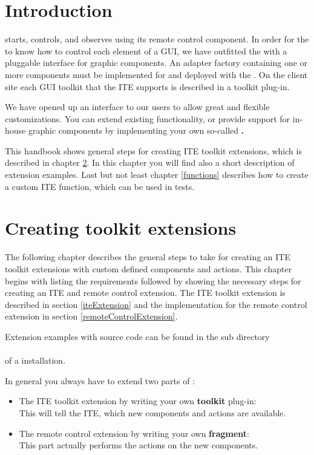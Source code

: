 \chapter{Introduction}
\label{introduction}

\app{} starts, controls, and observes \gdauts using its remote control component. In
order for the \gdagent to know how to control each element of a GUI, we have
outfitted the \gdagent with a pluggable interface for graphic components. An
adapter factory containing one or more components must be implemented for and
deployed with the \gdaut. On the client site each GUI toolkit that the ITE
supports is described in a toolkit plug-in.

We have opened up an interface to our users to allow great and flexible
customizations. You can extend existing functionality, or provide support for
in-house graphic components by implementing your own so-called
\textbf{\gdtesterclasses.}

This handbook shows general steps for creating ITE toolkit extensions, which
is described in chapter \ref{toolkitExtension}. In this chapter you will find
also  a short description of extension examples. Last but not least chapter
\ref{functions} describes how to create a custom ITE function, which can be
used in tests.

\chapter{Creating toolkit extensions}
\label{toolkitExtension}

The following chapter describes the general steps to take for creating an ITE
toolkit extensions with custom defined components and actions. This chapter
begins with listing the requirements followed by showing the necessary steps
for creating an ITE and remote control extension. The ITE toolkit extension is
described in section \ref{iteExtension} and the implementation for the remote
control extension in section \ref{remoteControlExtension}.

Extension examples with source code can be found in the sub directory\\
\\
of a \app{} installation.

In general you always have to extend two parts of \app{}:
\begin{itemize}
\item The ITE toolkit extension by writing your own \textbf{toolkit} plug-in:\\
      This will tell the ITE, which new components and actions are
      available.
\item The remote control extension by writing your own \textbf{fragment}:\\
      This part actually performs the actions on the new components.
\end{itemize}

